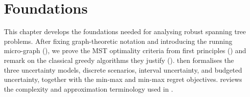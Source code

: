 %
%
%
%
%

\chapter{Foundations}\label{ch:foundations}

This chapter develops the foundations needed for analysing robust spanning tree problems.
After fixing graph-theoretic notation and introducing the running micro-graph (), we prove the MST optimality criteria from first principles () and remark on the classical greedy algorithms they justify ().
 then formalises the three uncertainty models, discrete scenarios, interval uncertainty, and budgeted uncertainty, together with the min-max and min-max regret objectives.
 reviews the complexity and approximation terminology used in .

